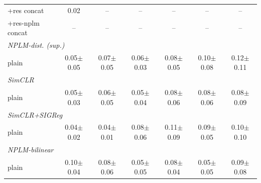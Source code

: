 \begin{center}
\begin{longtable}{lcccccc}
\quad +res concat & 0.02 & -- & -- & -- & -- & -- \\
\quad +res-nplm concat & -- & -- & -- & -- & -- & -- \\
\multicolumn{7}{l}{\emph{NPLM-dist. (sup.)}} \\
\quad plain & 0.05$\pm$0.05 & 0.07$\pm$0.05 & 0.06$\pm$0.03 & 0.08$\pm$0.05 & 0.10$\pm$0.08 & 0.12$\pm$0.11 \\
\multicolumn{7}{l}{\emph{SimCLR}} \\
\quad plain & 0.05$\pm$0.03 & 0.06$\pm$0.05 & 0.05$\pm$0.04 & 0.08$\pm$0.06 & 0.08$\pm$0.06 & 0.08$\pm$0.09 \\
\multicolumn{7}{l}{\emph{SimCLR+SIGReg}} \\
\quad plain & 0.04$\pm$0.02 & 0.04$\pm$0.01 & 0.08$\pm$0.06 & 0.11$\pm$0.09 & 0.09$\pm$0.05 & 0.10$\pm$0.10 \\
\multicolumn{7}{l}{\emph{NPLM-bilinear}} \\
\quad plain & 0.10$\pm$0.04 & 0.08$\pm$0.06 & 0.05$\pm$0.05 & 0.08$\pm$0.04 & 0.05$\pm$0.05 & 0.09$\pm$0.08 \\
\end{longtable}
\end{center}
